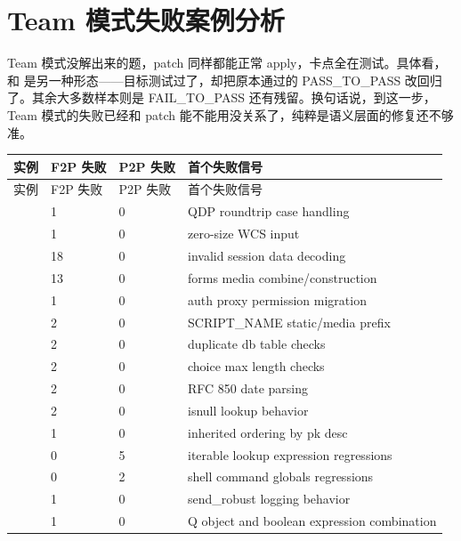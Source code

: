 \documentclass[UTF8,a4paper,11pt]{ctexart}
\begin{document}
\section{Team 模式失败案例分析}

Team 模式没解出来的题，patch 同样都能正常 apply，卡点全在测试。具体看， 和  是另一种形态——目标测试过了，却把原本通过的 PASS\_TO\_PASS 改回归了。其余大多数样本则是 FAIL\_TO\_PASS 还有残留。换句话说，到这一步，Team 模式的失败已经和 patch 能不能用没关系了，纯粹是语义层面的修复还不够准。

\begin{center}
{\small
\begin{longtable}{L{4.1cm} C{1.6cm} C{1.7cm} L{7.0cm}}
\toprule
实例 & F2P 失败 & P2P 失败 & 首个失败信号 \\
\midrule
\endfirsthead
\toprule
实例 & F2P 失败 & P2P 失败 & 首个失败信号 \\
\midrule
\endhead
{} & 1 & 0 & QDP roundtrip case handling \\
 & 1 & 0 & zero-size WCS input \\
 & 18 & 0 & invalid session data decoding \\
 & 13 & 0 & forms media combine/construction \\
 & 1 & 0 & auth proxy permission migration \\
 & 2 & 0 & SCRIPT\_NAME static/media prefix \\
 & 2 & 0 & duplicate db table checks \\
 & 2 & 0 & choice max length checks \\
 & 2 & 0 & RFC 850 date parsing \\
 & 2 & 0 & isnull lookup behavior \\
 & 1 & 0 & inherited ordering by pk desc \\
 & 0 & 5 & iterable lookup expression regressions \\
 & 0 & 2 & shell command globals regressions \\
 & 1 & 0 & send\_robust logging behavior \\
 & 1 & 0 & Q object and boolean expression combination \\

\end{longtable}}
\end{center}
\end{document}
